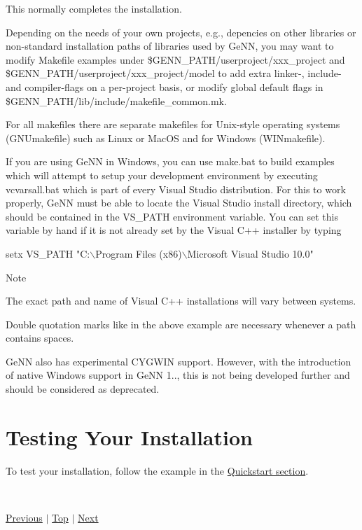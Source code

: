 This normally completes the installation.

Depending on the needs of your own projects, e.\+g., depencies on other libraries or non-\/standard installation paths of libraries used by Ge\+N\+N, you may want to modify Makefile examples under {\ttfamily \$\+G\+E\+N\+N\+\_\+\+P\+A\+T\+H/userproject/xxx\+\_\+project} and {\ttfamily \$\+G\+E\+N\+N\+\_\+\+P\+A\+T\+H/userproject/xxx\+\_\+project/model} to add extra linker-\/, include-\/ and compiler-\/flags on a per-\/project basis, or modify global default flags in \$\+G\+E\+N\+N\+\_\+\+P\+A\+T\+H/lib/include/makefile\+\_\+common.mk.

For all makefiles there are separate makefiles for Unix-\/style operating systems (G\+N\+Umakefile) such as Linux or Mac\+O\+S and for Windows (W\+I\+Nmakefile).

If you are using Ge\+N\+N in Windows, you can use make.\+bat to build examples which will attempt to setup your development environment by executing {\ttfamily vcvarsall.\+bat} which is part of every Visual Studio distribution. For this to work properly, Ge\+N\+N must be able to locate the Visual Studio install directory, which should be contained in the {\ttfamily V\+S\+\_\+\+P\+A\+T\+H} environment variable. You can set this variable by hand if it is not already set by the Visual C++ installer by typing 
\begin{DoxyCode}
setx VS\_PATH \textcolor{stringliteral}{"C:\(\backslash\)Program Files (x86)\(\backslash\)Microsoft Visual Studio 10.0"}
\end{DoxyCode}


\begin{DoxyNote}{Note}

\begin{DoxyItemize}
\item The exact path and name of Visual C++ installations will vary between systems.
\item Double quotation marks like in the above example are necessary whenever a path contains spaces.
\end{DoxyItemize}
\end{DoxyNote}
Ge\+N\+N also has experimental C\+Y\+G\+W\+I\+N support. However, with the introduction of native Windows support in Ge\+N\+N 1.., this is not being developed further and should be considered as deprecated.\hypertarget{Installation_sec_testInstall_sec}{}\section{Testing Your Installation}\label{Installation_sec_testInstall_sec}
To test your installation, follow the example in the \hyperlink{Quickstart_sec}{Quickstart section}.

~\newline
 

 \hyperlink{index_Contents_sec}{Previous} $\vert$ \hyperlink{Installation_sec}{Top} $\vert$ \hyperlink{Quickstart_sec}{Next} 